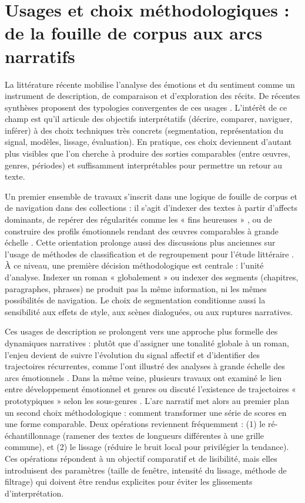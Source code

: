 \documentclass[fra, final]{anthology-ch}      %
\begin{document}
\section{Usages et choix méthodologiques : de la fouille de corpus aux arcs narratifs}

La littérature récente mobilise l’analyse des émotions et du sentiment comme un instrument de description, de comparaison et d’exploration des récits. De récentes synthèses proposent des typologies convergentes de ces usages \parencite{kimklinger2021survey}. L’intérêt de ce champ est qu’il articule des objectifs interprétatifs (décrire, comparer, naviguer, inférer) à des choix techniques très concrets (segmentation, représentation du signal, modèles, lissage, évaluation). En pratique, ces choix deviennent d’autant plus visibles que l’on cherche à produire des sorties comparables (entre œuvres, genres, périodes) et suffisamment interprétables pour permettre un retour au texte.

Un premier ensemble de travaux s’inscrit dans une logique de fouille de corpus et de navigation dans des collections : il s’agit d’indexer des textes à partir d’affects dominants, de repérer des régularités comme les « fins heureuses » \parencite{zehe2016happyendings}, ou de construire des profils émotionnels rendant des œuvres comparables à grande échelle \parencite{kakkonen2011sentiprofiler}. Cette orientation prolonge aussi des discussions plus anciennes sur l’usage de méthodes de classification et de regroupement pour l’étude littéraire \parencite{yu2008litstudy}. À ce niveau, une première décision méthodologique est centrale : l’unité d’analyse. Indexer un roman « globalement » ou indexer des segments (chapitres, paragraphes, phrases) ne produit pas la même information, ni les mêmes possibilités de navigation. Le choix de segmentation conditionne aussi la sensibilité aux effets de style, aux scènes dialoguées, ou aux ruptures narratives.

Ces usages de description se prolongent vers une approche plus formelle des dynamiques narratives : plutôt que d’assigner une tonalité globale à un roman, l’enjeu devient de suivre l’évolution du signal affectif et d’identifier des trajectoires récurrentes, comme l’ont illustré des analyses à grande échelle des arcs émotionnels \parencite{reagan2016emotionalarcs}. Dans la même veine, plusieurs travaux ont examiné le lien entre développement émotionnel et genres \parencite{kimpadoklinger2017genres} ou discuté l’existence de trajectoires « prototypiques » selon les sous-genres \parencite{kimpadoklinger2017prototypes}. L’arc narratif met alors au premier plan un second choix méthodologique : comment transformer une série de scores en une forme comparable. Deux opérations reviennent fréquemment : (1) le ré-échantillonnage (ramener des textes de longueurs différentes à une grille commune), et (2) le lissage (réduire le bruit local pour privilégier la tendance). Ces opérations répondent à un objectif comparatif et de lisibilité, mais elles introduisent des paramètres (taille de fenêtre, intensité du lissage, méthode de filtrage) qui doivent être rendus explicites pour éviter les glissements d’interprétation.
\end{document}
